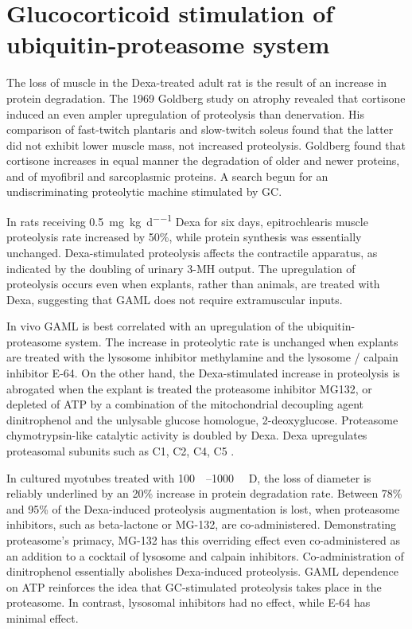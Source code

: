 \documentclass[12pt,english]{report}\usepackage[]{graphicx}\usepackage[]{color}
\begin{document}
\section{Glucocorticoid stimulation of ubiquitin-proteasome system}

The loss of muscle in the Dexa-treated adult rat is the result of
an increase in protein degradation. The 1969 Goldberg study on atrophy
revealed that cortisone induced an even ampler upregulation of proteolysis
than denervation\citep{goldberg1969protein}. His comparison of fast-twitch
plantaris and slow-twitch soleus found that the latter did not exhibit
lower muscle mass, not increased proteolysis. Goldberg found that
cortisone increases in equal manner the degradation of older and newer
proteins, and of myofibril and sarcoplasmic proteins. A search begun
for an undiscriminating proteolytic machine stimulated by GC.

In rats receiving \SI{0.5}{\milli\gram\per\kilo\gram\per\day} Dexa
for six days, epitrochlearis muscle proteolysis rate increased by
50\%, while protein synthesis was essentially unchanged\citep{dardevet1995sensitivity}.
Dexa-stimulated proteolysis affects the contractile apparatus, as
indicated by the doubling of urinary 3-MH output\citep{seene1988effect}.
The upregulation of proteolysis occurs even when explants, rather
than animals, are treated with Dexa, suggesting that GAML does not
require extramuscular inputs\citep{wing1993glucocorticoids}.

In vivo GAML is best correlated with an upregulation of the ubiquitin-proteasome
system. The increase in proteolytic rate is unchanged when explants
are treated with the lysosome inhibitor methylamine and the lysosome
/ calpain inhibitor E-64. On the other hand, the Dexa-stimulated increase
in proteolysis is abrogated when the explant is treated the proteasome
inhibitor MG132\citep{combaret2004glucocorticoids}, or depleted of
ATP by a combination of the mitochondrial decoupling agent dinitrophenol
and the unlysable glucose homologue, 2-deoxyglucose\citep{tiao1996energy-ubiquitin-dependent}.
Proteasome chymotrypsin-like catalytic activity is doubled by Dexa\citep{gilson2007myostatin}.
Dexa upregulates proteasomal subunits such as C1, C2, C4, C5 \citep{dardevet1995sensitivity,combaret2004glucocorticoids}. 

In cultured myotubes treated with \SIrange{100}{1000}{\nano\molar}
D, the loss of diameter is reliably underlined by an 20\% increase
in protein degradation rate\citep{wang1998dexamethasone,menconi2008dexamethasone}.
Between 78\% and 95\% of the Dexa-induced proteolysis augmentation
is lost, when proteasome inhibitors, such as beta-lactone or MG-132,
are co-administered\citep{wang1998dexamethasone,thompson1999stimulation}.
Demonstrating proteasome's primacy, MG-132 has this overriding effect
even co-administered as an addition to a cocktail of lysosome and
calpain inhibitors\citep{combaret2004glucocorticoids}. Co-administration
of dinitrophenol essentially abolishes Dexa-induced proteolysis\citep{wang1998dexamethasone}.
GAML dependence on ATP reinforces the idea that GC-stimulated proteolysis
takes place in the proteasome. In contrast, lysosomal inhibitors had
no effect, while E-64 has minimal effect\citep{wang1998dexamethasone}.
\end{document}
